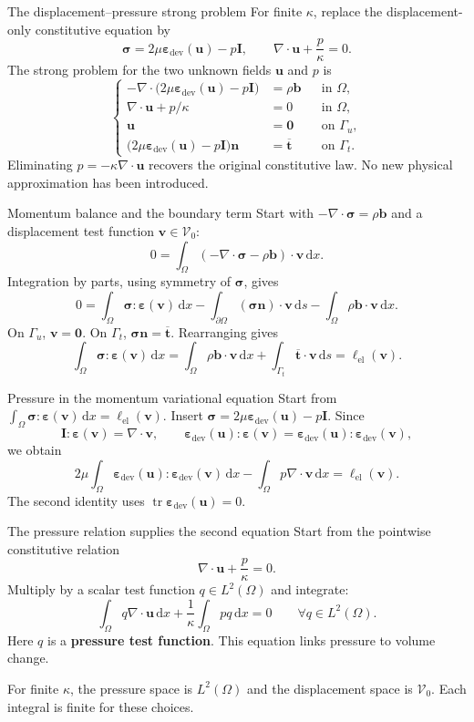 \documentclass[11pt,aspectratio=169]{beamer}
\newcommand{\bu}{\bm u}
\newcommand{\bv}{\bm v}
\newcommand{\bn}{\bm n}
\newcommand{\bb}{\bm b}
\newcommand{\bt}{\bm t}
\newcommand{\bI}{\bm I}
\newcommand{\beps}{\bm\varepsilon}
\newcommand{\bsig}{\bm\sigma}
\newcommand{\Om}{\Omega}
\newcommand{\Vzero}{\mathcal V_0}
\newcommand{\dd}{\,\mathrm d}
\newcommand{\divg}{\nabla\!\cdot}
\DeclareMathOperator{\tr}{tr}
\begin{document}
\begin{frame}{The displacement--pressure strong problem}
For finite $\kappa$, replace the displacement-only constitutive equation by
\[
\bsig=2\mu\beps_{\mathrm{dev}}(\bu)-p\bI,
\qquad \divg\bu+\frac{p}{\kappa}=0.
\]
The strong problem for the two unknown fields $\bu$ and $p$ is
\[
\left\{\begin{aligned}
-\divg\bigl(2\mu\beps_{\mathrm{dev}}(\bu)-p\bI\bigr)
&=\rho\bb &&\text{in }\Om,\\
\divg\bu+p/\kappa&=0 &&\text{in }\Om,\\
\bu&=\bm0 &&\text{on }\Gamma_u,\\
\bigl(2\mu\beps_{\mathrm{dev}}(\bu)-p\bI\bigr)\bn
&=\overline{\bt} &&\text{on }\Gamma_t.
\end{aligned}\right.
\]
Eliminating $p=-\kappa\divg\bu$ recovers the original constitutive law.
No new physical approximation has been introduced.
\end{frame}

\begin{frame}{Momentum balance and the boundary term}
Start with $-\divg\bsig=\rho\bb$ and a displacement test function $\bv\in\Vzero$:
\[
0=\int_\Om(-\divg\bsig-\rho\bb)\cdot\bv\dd x.
\]
Integration by parts, using symmetry of $\bsig$, gives
\[
0=\int_\Om\bsig:\beps(\bv)\dd x
-\int_{\partial\Om}(\bsig\bn)\cdot\bv\dd s
-\int_\Om\rho\bb\cdot\bv\dd x.
\]
On $\Gamma_u$, $\bv=\bm0$. On $\Gamma_t$, $\bsig\bn=\overline{\bt}$.
Rearranging gives
\[
\int_\Om\bsig:\beps(\bv)\dd x
=\int_\Om\rho\bb\cdot\bv\dd x
+\int_{\Gamma_t}\overline{\bt}\cdot\bv\dd s
=\ell_{\mathrm{el}}(\bv).
\]
\end{frame}

\begin{frame}{Pressure in the momentum variational equation}
Start from $\int_\Om\bsig:\beps(\bv)\dd x=\ell_{\mathrm{el}}(\bv)$.
Insert $\bsig=2\mu\beps_{\mathrm{dev}}(\bu)-p\bI$. Since
\[
\bI:\beps(\bv)=\divg\bv,\qquad
\beps_{\mathrm{dev}}(\bu):\beps(\bv)
=\beps_{\mathrm{dev}}(\bu):\beps_{\mathrm{dev}}(\bv),
\]
we obtain
\[
\boxed{2\mu\int_\Om\beps_{\mathrm{dev}}(\bu):\beps_{\mathrm{dev}}(\bv)\dd x
-\int_\Om p\divg\bv\dd x=\ell_{\mathrm{el}}(\bv).}
\]
The second identity uses $\tr\beps_{\mathrm{dev}}(\bu)=0$.
\end{frame}

\begin{frame}{The pressure relation supplies the second equation}
Start from the pointwise constitutive relation
\[
\divg\bu+\frac{p}{\kappa}=0.
\]
Multiply by a scalar test function $q\in L^2(\Om)$ and integrate:
\[
\boxed{\int_\Om q\divg\bu\dd x
+\frac1\kappa\int_\Om pq\dd x=0
\qquad\forall q\in L^2(\Om).}
\]
Here $q$ is a \textbf{pressure test function}. This equation links pressure
to volume change.

For finite $\kappa$, the pressure space is $L^2(\Om)$ and the displacement
space is $\Vzero$. Each integral is finite for these choices.
\end{frame}
\end{document}
